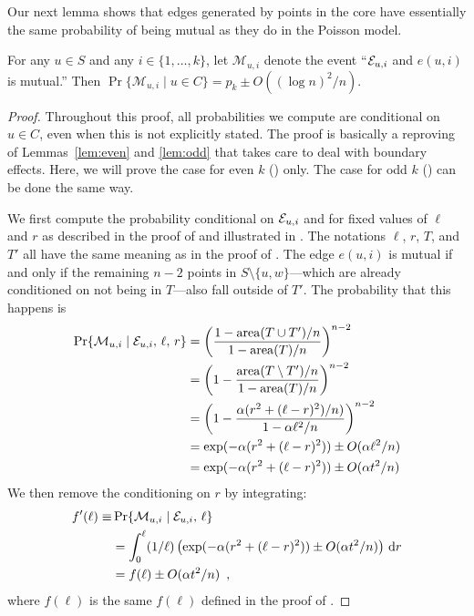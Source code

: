 \documentclass{patmorin}
\DeclareMathOperator{\area}{area}
\begin{document}
\newcommand{\mui}{\mathcal{M}_{u,i}}

Our next lemma shows that edges generated by points in the core have
essentially the same probability of being mutual as they do in the
Poisson model.

\begin{lem}
    For any $u\in S$ and any $i\in\{1,\ldots,k\}$, let $\mui$ denote the
    event ``$\mathcal{E}_{u,i}$ and $e(u,i)$ is mutual.'' Then $\Pr\{\mui\mid u\in C\}
    = p_k\pm O((\log n)^2/n)$.
\end{lem}

\begin{proof}
Throughout this proof, all probabilities we compute are conditional on
$u\in C$, even when this is not explicitly stated.  The proof is basically
a reproving of Lemmas~\ref{lem:even} and \ref{lem:odd} that takes care to
deal with boundary effects.  Here, we will prove the case for even $k$
() only.  The case for odd $k$ () can be done
the same way.

We first compute the probability conditional on $\mathcal{E}_{u,i}$ and for fixed
values of $\ell$ and $r$ as described in the proof of 
and illustrated in .  The notations $\ell$, $r$, $T$,
and $T'$ all have the same meaning as in the proof of .
The edge $e(u,i)$ is mutual if and only if the remaining $n-2$ points
in $S\setminus\{u,w\}$---which are already conditioned on not being in
$T$---also fall outside of $T'$.  The probability that this happens is
\begin{align*}
   \Pr\{\mui\mid\eui,\,\ell,\, r\}
        & = \left(\frac{1-\area(T\cup T')/n}{1-\area(T)/n}\right)^{n-2} \\
        & = \left(1-\frac{\area(T\setminus T')/n}{1-\area(T)/n}\right)^{n-2} \\
        & = \left(1-\frac{\alpha(r^2+(\ell-r)^2)/n)}
                       {1-\alpha\ell^2/n}\right)^{n-2} \\
        & = \exp(-\alpha(r^2+(\ell-r)^2)) \pm O(\alpha\ell^2/n) \\
        & = \exp(-\alpha(r^2+(\ell-r)^2)) \pm O(\alpha t^2/n)
\end{align*}
We then remove the conditioning on $r$ by integrating:
\begin{align*}
   f'(\ell) \equiv & \Pr\{\mui\mid\eui,\,\ell\} \\
     & = \int_0^\ell(1/\ell)\left(\exp(-\alpha(r^2+(\ell-r)^2)) 
           \pm O(\alpha t^2/n)\right)\,\mathrm{d}r \\
     & = f(\ell) \pm O(\alpha t^2/n) \enspace ,
\end{align*}
where $f(\ell)$ is the same $f(\ell)$ defined in the proof of .


\end{proof}
\end{document}
